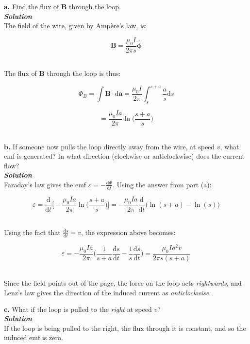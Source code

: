 \documentclass[9pt]{extarticle}
\renewcommand{\v}[1]{{\bm #1}}
\newcommand{\hv}[1]{\hat{\bm{#1}}}
\newcommand{\bfit}[1]{\textbf{\textit{#1}}}
\renewcommand{\d}{\text{d}}
\newcommand{\ddt}[1]{\frac{\d #1}{\d t}}
\newcommand{\muo}{\mu_0}
\begin{document}
\begin{multicols*}{2}
{\Large \bf a.} Find the flux of $\v B$ through the loop. \\ 

{\bfit{Solution}} \\ 

The field of the wire, given by Ampère's law, is:

$$\v B = \frac{\muo I}{2\pi s} \hv \phi$$ \ 

The flux of $\v B$ through the loop is thus:

$$\Phi_B = \int \v B \cdot \d \v a = \frac{\muo I}{2\pi} \int_s^{s+a} \frac as \d s$$

$$= \frac{\muo Ia}{2\pi} \ln \bigg( \frac{s+a}{s} \bigg)$$ \ 



\dotfill 

\hfill 

{\Large \bf b.} If someone now pulls the loop directly away from the wire, at speed $v$, what emf is generated? In what direction (clockwise or anticlockwise) does the current flow? \\ 

{\bfit{Solution}} \\ 

Faraday's law gives the emf $\varepsilon = -\ddt \Phi$. Using the answer from part (a):

$$\varepsilon = \ddt{} \Bigg[ -\frac{\muo Ia}{2\pi} \ln \bigg( \frac{s+a}{s} \bigg) \Bigg] = -\frac{\muo Ia}{2\pi} \ddt{} \bigg( \ln (s+a) - \ln(s) \bigg)$$ \ 

Using the fact that $\ddt s = v$, the expression above becomes:

$$\varepsilon = -\frac{\muo  I a}{2\pi} \bigg( \frac{1}{s+a} \ddt s - \frac 1s \ddt s \bigg) = \frac{\muo I a^2 v}{2\pi s(s+a)}$$ \ 

Since the field points out of the page, the force on the loop acts {\it rightwards}, and Lenz's law gives the direction of the induced current as {\it anticlockwise}. \\ 



\dotfill 

\hfill 

{\Large \bf c.} What if the loop is pulled to the {\it right} at speed $v$? \\ 

{\bfit{Solution}} \\ 

If the loop is being pulled to the right, the flux through it is constant, and so the induced emf is zero. 


\end{multicols*}
\end{document}
